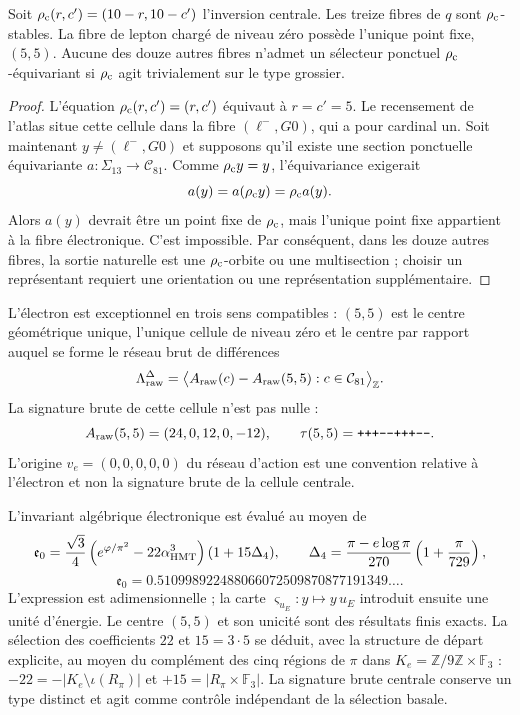\begin{theorem}
Soit \(\rho_{\rm c}(r,c')=(10-r,10-c')\) l'inversion centrale. Les treize fibres de
\(q\) sont \(\rho_{\rm c}\)-stables. La fibre de lepton chargé de niveau zéro possède
l'unique point fixe, \((5,5)\). Aucune des douze autres fibres n'admet
un sélecteur ponctuel \(\rho_{\rm c}\)-équivariant si \(\rho_{\rm c}\) agit trivialement
sur le type grossier.
\end{theorem}
\begin{proof}
L'équation \(\rho_{\rm c}(r,c')=(r,c')\) équivaut à \(r=c'=5\). Le recensement de l'atlas
situe cette cellule dans la fibre \((\ell^-,G0)\), qui a pour cardinal un. Soit
maintenant \(y\neq(\ell^-,G0)\) et supposons qu'il existe une section ponctuelle
équivariante \(a:\Sigma_{13}\to\mathcal C_{81}\). Comme \(\rho_{\rm c} y=y\),
l'équivariance exigerait
\[
 a(y)=a(\rho_{\rm c} y)=\rho_{\rm c} a(y).
\]
Alors \(a(y)\) devrait être un point fixe de \(\rho_{\rm c}\), mais l'unique
point fixe appartient à la fibre électronique. C'est impossible. Par conséquent,
dans les douze autres fibres, la sortie naturelle est une \(\rho_{\rm c}\)-orbite ou une
multisection ; choisir un représentant requiert une orientation ou une
représentation supplémentaire.
\end{proof}

L'électron est exceptionnel en trois sens compatibles : \((5,5)\) est le
centre géométrique unique, l'unique cellule de niveau zéro et le centre par rapport
auquel se forme le réseau brut de différences
\[
 \Lambda_{\rm raw}^{\Delta}
 =\bigl\langle A_{\rm raw}(c)-A_{\rm raw}(5,5):
 c\in\mathcal C_{81}\bigr\rangle_{\mathbb Z}.
\]
La signature brute de cette cellule n'est pas nulle :
\[
 A_{\rm raw}(5,5)=(24,0,12,0,-12),
 \qquad \tau(5,5)=\texttt{+++---+++---}.
\]
L'origine \(v_e=(0,0,0,0,0)\) du réseau d'action est une convention
relative à l'électron et non la signature brute de la cellule centrale.

L'invariant algébrique électronique est évalué au moyen de
\[
 \mathfrak e_0=
 \frac{\sqrt3}{4}
 \left(e^{\varphi/\pi^2}-22\alpha_{\rm HMT}^{3}\right)
 (1+15\Delta_4),
 \qquad
 \Delta_4=
 \frac{\pi-e\log\pi}{270}\left(1+\frac{\pi}{729}\right),
\]
\[
 \mathfrak e_0
 =0.510998922488066072509870877191349\ldots.
\]
L'expression est adimensionnelle ; la carte
\(\varsigma_{u_E}:y\mapsto y\,u_E\) introduit ensuite une unité d'énergie.
Le centre \((5,5)\) et son unicité sont des résultats finis exacts. La sélection
des coefficients \(22\) et \(15=3\cdot5\) se déduit, avec la structure de
départ explicite, au moyen du complément
des cinq régions de \(\pi\) dans \(K_e=\mathbb Z/9\mathbb Z\times\mathbb F_3\) :
\(-22=-|K_e\setminus\iota(R_\pi)|\) et
\(+15=|R_\pi\times\mathbb F_3|\). La signature brute centrale conserve un type
distinct et agit comme contrôle indépendant de la sélection basale.

